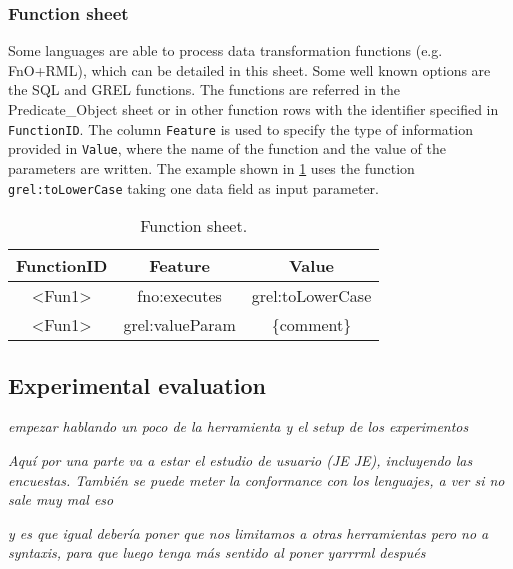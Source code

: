 \subsubsection{Function sheet} Some languages are able to process data transformation functions (e.g. FnO+RML), which can be detailed in this sheet. Some well known options are the SQL and GREL functions. The functions are referred in the Predicate\_Object sheet or in other function rows with the identifier specified in \texttt{FunctionID}. The column \texttt{Feature} is used to specify the type of information provided in \texttt{Value}, where the name of the function and the value of the parameters are written. The example shown in \cref{tab:function_sheet} uses the function \texttt{grel:toLowerCase} taking one data field as input parameter.

\begin{table}[h!]
\caption{Function sheet.}
\label{tab:function_sheet}
\centering
\begin{tabular}{c|c|c}
\midrule
\textbf{FunctionID} & \textbf{Feature} & \textbf{Value} \\ \midrule
\textless{}Fun1\textgreater{} & fno:executes & grel:toLowerCase \\  
\textless{}Fun1\textgreater{} & grel:valueParam & \{comment\} \\
\midrule
\end{tabular}
\end{table}



\subsection{Experimental evaluation}

\textit{empezar hablando un poco de la herramienta y el setup de los experimentos}

\textit{Aquí por una parte va a estar el estudio de usuario (JE JE), incluyendo las encuestas. También se puede meter la conformance con los lenguajes, a ver si no sale muy mal eso}

\textit{y es que igual debería poner que nos limitamos a otras herramientas pero no a syntaxis, para que luego tenga más sentido al poner yarrrml después}